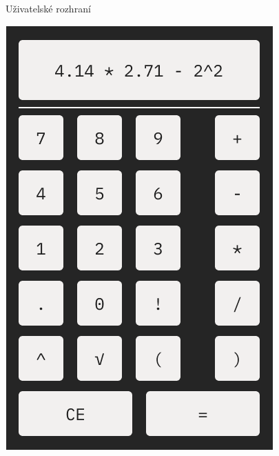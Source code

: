 \documentclass[fleqn]{beamer}
\begin{document}
\begin{frame}{Uživatelské rozhraní}
\begin{center}
\begin{minipage}[t]{0.35\linewidth}
    \centering
    \includegraphics[width=0.9\linewidth]{mockup.png}
\end{minipage}
\pause
\hspace{0.05\textwidth}
\raisebox{3cm}{\Large$\Rightarrow$}
\hspace{0.05\textwidth}
\begin{minipage}[t]{0.35\linewidth}
    \centering

\end{minipage}
\end{center}
\end{frame}
\end{document}
